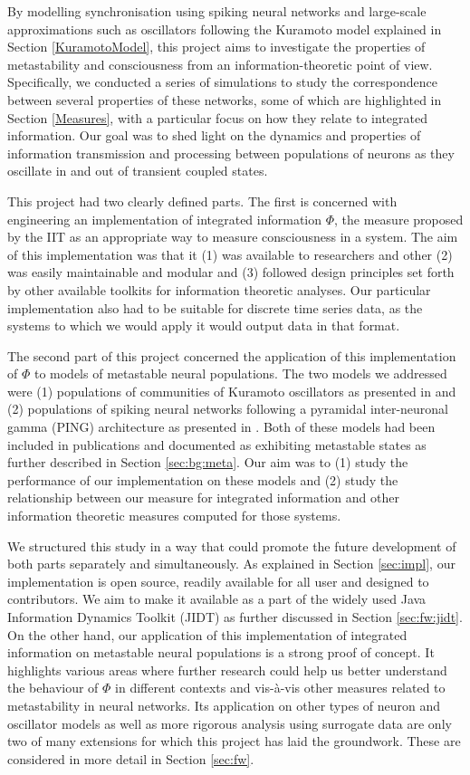 \documentclass[a4paper,11pt]{article}
\begin{document}
By modelling synchronisation using spiking neural networks and large-scale approximations such as oscillators following the Kuramoto model explained in Section \ref{KuramotoModel}, this project aims to investigate the properties of metastability and consciousness from an information-theoretic point of view. Specifically, we conducted a series of simulations to study the correspondence between several properties of these networks, some of which are highlighted in Section \ref{Measures}, with a particular focus on how they relate to integrated information. Our goal was to shed light on the dynamics and properties of information transmission and processing between populations of neurons as they oscillate in and out of transient coupled states.

This project had two clearly defined parts. The first is concerned with engineering an implementation of integrated information $\Phi$, the measure proposed by the IIT as an appropriate way to measure consciousness in a system. The aim of this implementation was that it (1) was available to researchers and other (2) was easily maintainable and modular and (3) followed design principles set forth by other available toolkits for information theoretic analyses. Our particular implementation also had to be suitable for discrete time series data, as the systems to which we would apply it would output data in that format.

The second part of this project concerned the application of this implementation of $\Phi$ to models of metastable neural populations. The two models we addressed were (1) populations of communities of Kuramoto oscillators as presented in \cite{Shanahan2010} and (2) populations of spiking neural networks following a pyramidal inter-neuronal gamma (PING) architecture as presented in \cite{Bhowmik2013}. Both of these models had been included in publications and documented as exhibiting metastable states as further described in Section \ref{sec:bg:meta}. Our aim was to (1) study the performance of our implementation on these models and (2) study the relationship between our measure for integrated information and other information theoretic measures computed for those systems. 

We structured this study in a way that could promote the future development of both parts separately and simultaneously. As explained in Section \ref{sec:impl}, our implementation is open source, readily available for all user and designed to contributors. We aim to make it available as a part of the widely used Java Information Dynamics Toolkit (JIDT) \cite{Lizier2014} as further discussed in Section \ref{sec:fw:jidt}. On the other hand, our application of this implementation of integrated information on metastable neural populations is a strong proof of concept. It highlights various areas where further research could help us better understand the behaviour of $\Phi$ in different contexts and vis-\`{a}-vis other measures related to metastability in neural networks. Its application on other types of neuron and oscillator models as well as more rigorous analysis using surrogate data are only two of many extensions for which this project has laid the groundwork. These are considered in more detail in Section \ref{sec:fw}.
\end{document}
